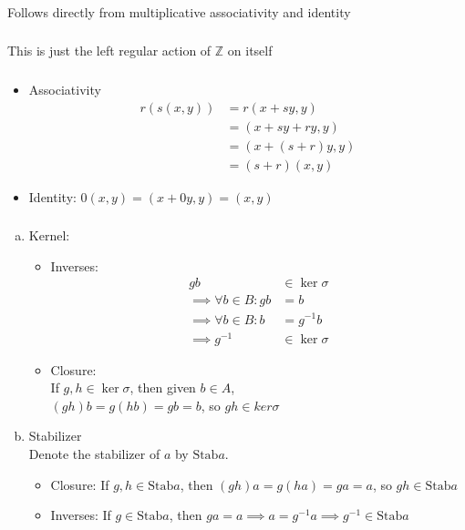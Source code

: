 \documentclass{article}
\newcommand{\ints}{\mathbb{Z}}
\newcommand{\inv}[1]{ {#1}^{-1} }
\newcommand{\Stab}{ \mbox{Stab} }
\begin{document}
\subsubsection{}\label{ex7p1}
Follows directly from multiplicative associativity and identity
\subsubsection{}\label{ex7p2}
This is just the left regular action of $\ints$ on itself
\subsubsection{}\label{ex7p3}
\begin{itemize}
\item Associativity
\begin{align*}
r(s(x,y)) &= r(x+sy,y)\\
&= (x+sy + ry, y)\\
&= (x+(s+r)y, y)\\
&= (s+r)(x,y)
\end{align*}
\item Identity: 
$0(x,y) = (x + 0y, y) = (x,y)$
\end{itemize}
\subsubsection{}\label{ex7p4}
\begin{enumerate}[(a)]
	\item Kernel:
		\begin{itemize}
			\item Inverses:\\
				
				\begin{align*}
				gb &\in \ker\sigma\\
				\implies \forall b\in B: gb &= b\\
				\implies \forall b\in B: b &= \inv{g}b\\
				\implies \inv{g} &\in \ker\sigma
				\end{align*}
			\item Closure:\\
				If $g,h\in \ker\sigma$, then given $b\in A$,\\
				$(gh)b = g(hb) = gb = b$, so $gh \in ker\sigma$
		\end{itemize}
	\item Stabilizer\\
		Denote the stabilizer of $a$ by $\Stab a$.
		\begin{itemize}
				\item Closure: If $g,h \in \Stab a$, then $(gh)a=g(ha)=ga=a$, so $gh \in \Stab a$
				\item Inverses: If $g\in\Stab a$, then $ga=a \implies a=\inv{g}a\implies \inv{g} \in \Stab a$
		\end{itemize}
\end{enumerate}
\end{document}
